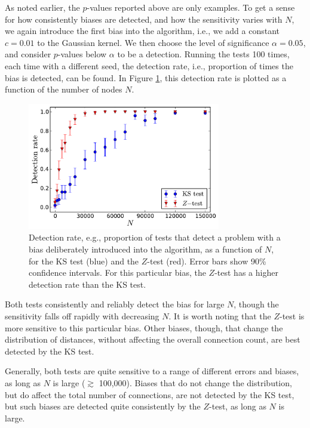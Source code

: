 As noted earlier, the $p$-values reported above are only examples. To get a sense for how consistently biases are detected, and how the sensitivity varies with $N$, we again introduce the first bias into the algorithm, i.e., we add a constant $c = 0.01$ to the Gaussian kernel. We then choose the level of significance $\alpha = 0.05$, and consider $p$-values below $\alpha$ to be a detection. Running the tests 100 times, each time with a different seed, the detection rate, i.e., proportion of times the bias is detected, can be found. In Figure \ref{fig:bias1_fails_vs_N}, this detection rate is plotted as a function of the number of nodes $N$.
\begin{figure}[t]
  \centering
  \includegraphics[width=0.75\textwidth]{fails_vs_N/bias_1_plot_fails.pdf}
  \caption[Detection rate as a function of network size]{Detection rate, e.g., proportion of tests that detect a problem with a bias deliberately introduced into the algorithm, as a function of $N$, for the KS test (blue) and the $Z$-test (red). Error bars show 90\% confidence intervals. For this particular bias, the $Z$-test has a higher detection rate than the KS test.}
  \label{fig:bias1_fails_vs_N}
\end{figure}
Both tests consistently and reliably detect the bias for large $N$, though the sensitivity falls off rapidly with decreasing $N$. It is worth noting that the $Z$-test is more sensitive to this particular bias. Other biases, though, that change the distribution of distances, without affecting the overall connection count, are best detected by the KS test. 

Generally, both tests are quite sensitive to a range of different errors and biases, as long as $N$ is large ($\gtrsim$ 100,000).
Biases that do not change the distribution, but do affect the total number of connections, are not detected by the KS test, but such biases are detected quite consistently by the $Z$-test, as long as $N$ is large.

